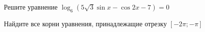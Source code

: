 \begin{ex}
	\begin{condition}
		\begin{enumcols}[label=\asbuk*)]
			\item Решите уравнение \( \log_6 (5\sqrt{3}\sin x - \cos 2x - 7) = 0 \)
			\item Найдите все корни уравнения, принадлежащие отрезку \( \left[-2\pi;-\pi\right] \)
		\end{enumcols}
	\end{condition}
\end{ex}